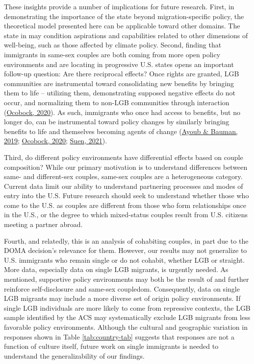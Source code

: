 \documentclass[
  12pt,
]{article}
\begin{document}
These insights provide a number of implications for future research. First, in demonstrating the importance of the state beyond migration-specific policy, the theoretical model presented here can be applicable toward other domains. The state in may condition aspirations and capabilities related to other dimensions of well-being, such as those affected by climate policy. Second, finding that immigrants in same-sex couples are both coming from more open policy environments and are locating in progressive U.S. states opens an important follow-up question: Are there reciprocal effects? Once rights are granted, LGB communities are instrumental toward consolidating new benefits by bringing them to life -- utilizing them, demonstrating supposed negative effects do not occur, and normalizing them to non-LGB communities through interaction (\protect\hyperlink{ref-ocobock_2020_leveraging}{Ocobock, 2020}). As such, immigrants who once had access to benefits, but no longer do, can be instrumental toward policy changes by similarly bringing benefits to life and themselves becoming agents of change (\protect\hyperlink{ref-ayoub_2019_migration}{Ayoub \& Bauman, 2019}; \protect\hyperlink{ref-ocobock_2020_leveraging}{Ocobock, 2020}; \protect\hyperlink{ref-suen_2021_sexual}{Suen, 2021}).

Third, do different policy environments have differential effects based on couple composition? While our primary motivation is to understand differences between same- and different-sex couples, same-sex couples are a heterogeneous category. Current data limit our ability to understand partnering processes and modes of entry into the U.S. Future research should seek to understand whether those who come to the U.S. as couples are different from those who form relationships once in the U.S., or the degree to which mixed-status couples result from U.S. citizens meeting a partner abroad.

Fourth, and relatedly, this is an analysis of cohabiting couples, in part due to the DOMA decision's relevance for them. However, our results may not generalize to U.S. immigrants who remain single or do not cohabit, whether LGB or straight. More data, especially data on single LGB migrants, is urgently needed. As mentioned, supportive policy environments may both be the result of and further reinforce self-disclosure and same-sex coupledom. Consequently, data on single LGB migrants may include a more diverse set of origin policy environments. If single LGB individuals are more likely to come from repressive contexts, the LGB sample identified by the ACS may systematically exclude LGB migrants from less favorable policy environments. Although the cultural and geographic variation in responses shown in Table \ref{tab:country-tab} suggests that responses are not a function of culture itself, future work on single immigrants is needed to understand the generalizability of our findings.
\end{document}
